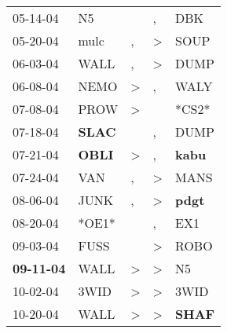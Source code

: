 \begin{supertabular}{p{0.07\textwidth}p{0.06\textwidth}p{0.02\textwidth}p{0.02\textwidth}p{0.06\textwidth}}
          05-14-04\textsuperscript{} &             N5\textsuperscript{} &                  &                , &            DBK\textsuperscript{} \\
          05-20-04\textsuperscript{} &           mulc\textsuperscript{} &                , &     \textgreater &           SOUP\textsuperscript{} \\
          06-03-04\textsuperscript{} &           WALL\textsuperscript{} &                , &     \textgreater &           DUMP\textsuperscript{} \\
          06-08-04\textsuperscript{} &           NEMO\textsuperscript{} &     \textgreater &                , &           WALY\textsuperscript{} \\
          07-08-04\textsuperscript{} &           PROW\textsuperscript{} &     \textgreater &                  &                            *CS2* \\
          07-18-04\textsuperscript{} &  \textbf{SLAC\textsuperscript{}} &                  &                , &           DUMP\textsuperscript{} \\
          07-21-04\textsuperscript{} &  \textbf{OBLI\textsuperscript{}} &     \textgreater &                , &  \textbf{kabu\textsuperscript{}} \\
          07-24-04\textsuperscript{} &            VAN\textsuperscript{} &                , &     \textgreater &           MANS\textsuperscript{} \\
          08-06-04\textsuperscript{} &           JUNK\textsuperscript{} &                , &     \textgreater &  \textbf{pdgt\textsuperscript{}} \\
          08-20-04\textsuperscript{} &                            *OE1* &                  &                , &            EX1\textsuperscript{} \\
          09-03-04\textsuperscript{} &           FUSS\textsuperscript{} &                  &     \textgreater &           ROBO\textsuperscript{} \\
 \textbf{09-11-04\textsuperscript{}} &           WALL\textsuperscript{} &     \textgreater &     \textgreater &             N5\textsuperscript{} \\
          10-02-04\textsuperscript{} &           3WID\textsuperscript{} &     \textgreater &     \textgreater &           3WID\textsuperscript{} \\
          10-20-04\textsuperscript{} &           WALL\textsuperscript{} &     \textgreater &     \textgreater &  \textbf{SHAF\textsuperscript{}} \\

\end{supertabular}
